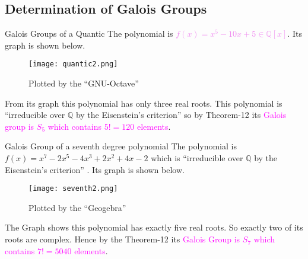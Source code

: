 \documentclass{beamer}
\begin{document}
\subsection{Determination of Galois Groups}
\begin{frame}{Galois Groups of a Quantic}
  The polynomial is \textcolor{violet}{\(f(x)=x^5-10x+5 \in \mathbb{Q}[x]\)}. Its graph is shown below.
  \begin{figure}[h!]
    \texttt{[image: quantic2.png]}
    \caption{\footnotesize Plotted by the ``GNU-Octave''}
  \end{figure}

 From its graph this polynomial has only three real roots. This polynomial is ``irreducible over \(\mathbb{Q}\) by the Eisenstein's criterion'' \cite{hunger} so by Theorem-12 its \textcolor{magenta}{Galois group is \(S_5\) which contains \(5!=120\) elements}.
\end{frame}


\begin{frame}{Galois Group of a seventh degree polynomial}
  The polynomial is \textcolor{green!50!black}{\(f(x)=x^7-2x^5-4x^3+2x^2+4x-2\)} which is ``irreducible over \(\mathbb{Q}\) by the Eisenstein's criterion'' \cite{hunger}. Its graph is shown below.

  \begin{figure}[h!]
    \texttt{[image: seventh2.png]}
    \caption{\footnotesize Plotted by the ``Geogebra''}
  \end{figure}

  The Graph shows this polynomial has exactly five real roots. So exactly two of its roots are complex. Hence by the Theorem-12 its \textcolor{magenta}{Galois Group is \(S_7\) which contains \(7!=5040\) elements}.
\end{frame}
\end{document}
